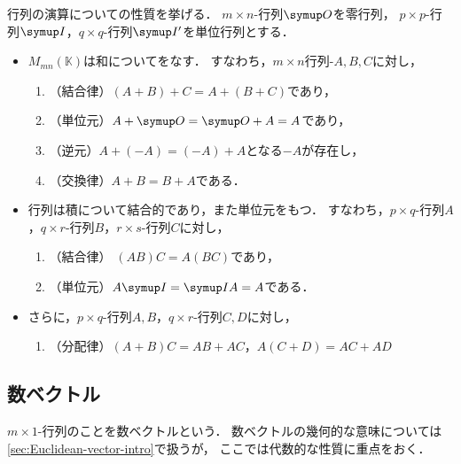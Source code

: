 \documentclass[../sotsu.tex]{subfiles}
\begin{document}
\begin{proposition}
    \label{thm:matrix-operation}
    行列の演算についての性質を挙げる．
    $m \times n$-行列$\zmat$を零行列，
    $p \times p$-行列$\umat$，$q \times q$-行列$\umat'$を単位行列とする．
    \begin{itemize}
        \item $M_{mn}(𝕂)$は和についてをなす．
            すなわち，$m \times n$行列-$A, B, C$に対し，
        \begin{enumerate}
            \item （結合律）$(A + B) + C = A + (B + C)$であり，
            \item （単位元）$A + \zmat = \zmat + A = A$であり，
            \item （逆元）$A + (-A) = (-A) + A$となる$-A$が存在し，
            \item （交換律）$A + B = B + A$である．
        \end{enumerate}
        \item 行列は積について結合的であり，また単位元をもつ．
            すなわち，$p \times q$-行列$A$，$q \times r$-行列$B$，$r \times s$-行列$C$に対し，
        \begin{enumerate}[resume]
            \item \label{matrix:product-associative}（結合律）
                $(AB)C = A(BC)$であり，
            \item （単位元）$A \umat = \umat A = A$である．
        \end{enumerate}
        \item さらに，$p \times q$-行列$A, B$，$q \times r$-行列$C, D$に対し，
        \begin{enumerate}[resume]
            \item （分配律）$(A + B)C = AB + AC$，$A(C + D) = AC + AD$
        \end{enumerate}
    \end{itemize}
\end{proposition}


\subsection{数ベクトル}
\label{sec:coordinate-space}

$m \times 1$-行列のことを数ベクトルという．
数ベクトルの幾何的な意味については\cref{sec:Euclidean-vector-intro}で扱うが，
ここでは代数的な性質に重点をおく．
\end{document}
